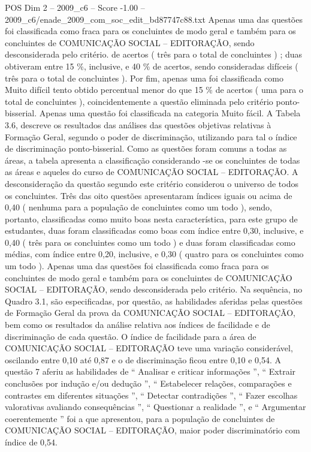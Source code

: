 \begin{textsample}{POS Dim 2 – 2009\_c6 – Score -1.00 – 2009\_c6/enade\_2009\_com\_soc\_edit\_bd87747c88.txt}
Apenas uma das questões foi classificada como fraca para os concluintes de modo geral e também para os concluintes de COMUNICAÇÃO SOCIAL – EDITORAÇÃO, sendo desconsiderada pelo critério. de acertos ( três para o total de concluintes ) ; duas obtiveram entre 15 \%, inclusive, e 40 \% de acertos, sendo consideradas difíceis ( três para o total de concluintes ).
Por fim, apenas uma foi classificada como Muito difícil tento obtido percentual menor do que 15 \% de acertos ( uma para o total de concluintes ), coincidentemente a questão eliminada pelo critério ponto-bisserial.
Apenas uma questão foi classificada na categoria Muito fácil.
A Tabela 3.6, descreve os resultados das análises das questões objetivas relativas à Formação Geral, segundo o poder de discriminação, utilizando para tal o índice de discriminação ponto-bisserial.
Como as questões foram comuns a todas as áreas, a tabela apresenta a classificação considerando -se os concluintes de todas as áreas e aqueles do curso de COMUNICAÇÃO SOCIAL – EDITORAÇÃO.
A desconsideração da questão segundo este critério considerou o universo de todos os concluintes.
Três das oito questões apresentaram índices iguais ou acima de 0,40 ( nenhuma para a população de concluintes como um todo ), sendo, portanto, classificadas como muito boas nesta característica, para este grupo de estudantes, duas foram classificadas como boas com índice entre 0,30, inclusive, e 0,40 ( três para os concluintes como um todo ) e duas foram classificadas como médias, com índice entre 0,20, inclusive, e 0,30 ( quatro para os concluintes como um todo ).
Apenas uma das questões foi classificada como fraca para os concluintes de modo geral e também para os concluintes de COMUNICAÇÃO SOCIAL – EDITORAÇÃO, sendo desconsiderada pelo critério.
Na sequência, no Quadro 3.1, são especificadas, por questão, as habilidades aferidas pelas questões de Formação Geral da prova da COMUNICAÇÃO SOCIAL – EDITORAÇÃO, bem como os resultados da análise relativa aos índices de facilidade e de discriminação de cada questão.
O índice de facilidade para a área de COMUNICAÇÃO SOCIAL – EDITORAÇÃO teve uma variação considerável, oscilando entre 0,10 até 0,87 e o de discriminação ficou entre 0,10 e 0,54.
A questão 7 aferiu as habilidades de “ Analisar e criticar informações ”, “ Extrair conclusões por indução e/ou dedução ”, “ Estabelecer relações, comparações e contrastes em diferentes situações ”, “ Detectar contradições ”, “ Fazer escolhas valorativas avaliando consequências ”, “ Questionar a realidade ”, e “ Argumentar coerentemente ” foi a que apresentou, para a população de concluintes de COMUNICAÇÃO SOCIAL – EDITORAÇÃO, maior poder discriminatório com índice de 0,54.

\end{textsample}

